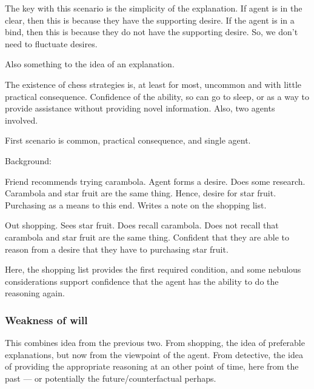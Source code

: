 \documentclass[10pt]{article}
\begin{document}
\begin{note}
  The key with this scenario is the simplicity of the explanation.
  If agent is in the clear, then this is because they have the supporting desire.
  If the agent is in a bind, then this is because they do not have the supporting desire.
  So, we don't need to fluctuate desires.

  Also something to the idea of an explanation.
\end{note}

The existence of chess strategies is, at least for most, uncommon and with little practical consequence.
Confidence of the ability, so can go to sleep, or as a way to provide assistance without providing novel information.
Also, two agents involved.

First scenario is common, practical consequence, and single agent.


\begin{scenario}[Shopping]

  Background:

  Friend recommends trying carambola.
  Agent forms a desire.
  Does some research.
  Carambola and star fruit are the same thing.
  Hence, desire for star fruit.
  Purchasing as a means to this end.
  Writes a note on the shopping list.

  Out shopping.
  Sees star fruit.
  Does recall carambola.
  Does not recall that carambola and star fruit are the same thing.
  Confident that they are able to reason from a desire that they have to purchasing star fruit.
\end{scenario}

\begin{note}
  Here, the shopping list provides the first required condition, and some nebulous considerations support confidence that the agent has the ability to do the reasoning again.
\end{note}


\subsubsection{Weakness of will}
\label{sec:weakness-will}

\begin{note}[Idea]
  This combines idea from the previous two.
  From shopping, the idea of preferable explanations, but now from the viewpoint of the agent.
  From detective, the idea of providing the appropriate reasoning at an other point of time, here from the past --- or potentially the future/counterfactual perhaps.
\end{note}
\end{document}
